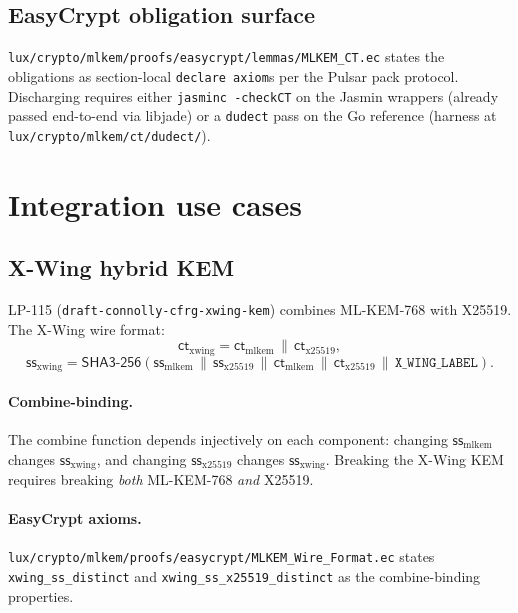 \documentclass[11pt,a4paper]{article}
\begin{document}
\subsection{EasyCrypt obligation surface}

\texttt{lux/crypto/mlkem/proofs/easycrypt/lemmas/MLKEM\_CT.ec} states
the obligations as section-local \texttt{declare axiom}s per
the Pulsar pack protocol. Discharging requires either
\texttt{jasminc -checkCT} on the Jasmin wrappers (already passed
end-to-end via libjade) or a \texttt{dudect} pass on the Go
reference (harness at
\texttt{lux/crypto/mlkem/ct/dudect/}).

\section{Integration use cases}\label{sec:use}

\subsection{X-Wing hybrid KEM}

LP-115 (\texttt{draft-connolly-cfrg-xwing-kem}) combines
ML-KEM-768 with X25519. The X-Wing wire format:
\[
  \mathsf{ct}_{\mathrm{xwing}}
  = \mathsf{ct}_{\mathrm{mlkem}} \,\|\, \mathsf{ct}_{\mathrm{x25519}},
\]
\[
  \mathsf{ss}_{\mathrm{xwing}}
  = \mathsf{SHA3\text{-}256}\!\left(
      \mathsf{ss}_{\mathrm{mlkem}} \,\|\,
      \mathsf{ss}_{\mathrm{x25519}} \,\|\,
      \mathsf{ct}_{\mathrm{mlkem}} \,\|\,
      \mathsf{ct}_{\mathrm{x25519}} \,\|\,
      \texttt{X\_WING\_LABEL}
    \right).
\]

\paragraph{Combine-binding.} The combine function depends
injectively on each component: changing $\mathsf{ss}_{\mathrm{mlkem}}$
changes $\mathsf{ss}_{\mathrm{xwing}}$, and changing
$\mathsf{ss}_{\mathrm{x25519}}$ changes
$\mathsf{ss}_{\mathrm{xwing}}$. Breaking the X-Wing KEM requires
breaking \emph{both} ML-KEM-768 \emph{and} X25519.

\paragraph{EasyCrypt axioms.}
\texttt{lux/crypto/mlkem/proofs/easycrypt/MLKEM\_Wire\_Format.ec}
states \texttt{xwing\_ss\_distinct} and
\texttt{xwing\_ss\_x25519\_distinct} as the combine-binding
properties.
\end{document}
